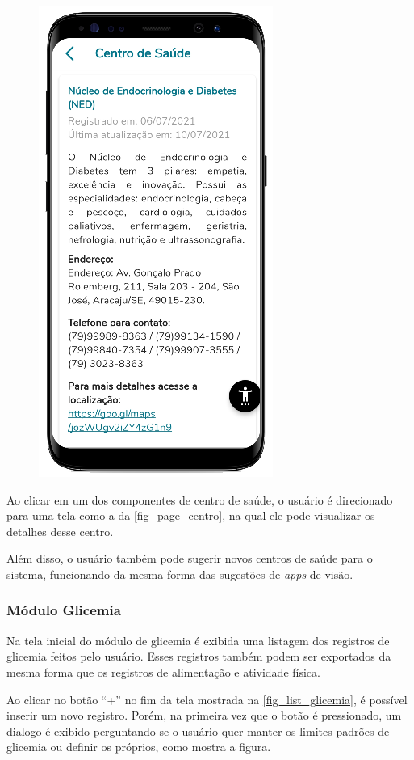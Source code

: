 \begin{figure}[htb]
\begin{minipage}{0.45\textwidth}
        \includegraphics[scale=0.7]{Imagens/desenvolvimento/app/page_centro.png}
    \end{minipage}
\end{figure}

Ao clicar em um dos componentes de centro de saúde, o usuário é direcionado para uma tela como a da
\autoref{fig_page_centro}, na qual ele pode visualizar os detalhes desse centro.

Além disso, o usuário também pode sugerir novos centros de saúde para o sistema, funcionando da mesma forma das
sugestões de \emph{apps} de visão.

\subsubsection{Módulo Glicemia}

Na tela inicial do módulo de glicemia é exibida uma listagem dos registros de glicemia feitos pelo usuário.
Esses registros também podem ser exportados da mesma forma que os registros de alimentação e atividade física.

Ao clicar no botão “+” no fim da tela mostrada na \autoref{fig_list_glicemia}, é possível inserir um novo registro. Porém, na primeira vez que o botão
é pressionado, um dialogo é exibido perguntando se o usuário quer manter os limites padrões de glicemia ou
definir os próprios, como mostra a figura.

